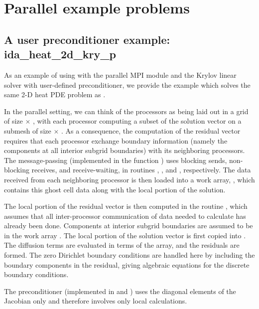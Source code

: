 \section{Parallel example problems}\label{s:ex_parallel}

\subsection{A user preconditioner example: ida\_heat\_2d\_kry\_p}\label{ss:idaHeat2D_p}

As an example of using {\ida} with the parallel MPI {\nvecp} module and the Krylov 
linear solver {\sunlinsolspgmr} with user-defined preconditioner, we provide the example
 which solves the same 2-D heat PDE problem as . 

In the parallel setting, we can think of the processors as being laid out
in a grid of size  $\times$ , with each processor computing
a subset of the solution vector on a submesh of size  $\times$
.  As a consequence, the computation of the residual
vector requires that each processor exchange boundary information
(namely the components at all interior subgrid boundaries) with its
neighboring processors.  The message-passing (implemented in the
function ) uses blocking sends, non-blocking receives, and
receive-waiting, in routines , , and
, respectively.  The data received from each neighboring
processor is then loaded into a work array, , which contains
this ghost cell data along with the local portion of the solution.

The local portion of the residual vector is then computed in the
routine , which assumes that all inter-processor
communication of data needed to calculate  has already been
done.  Components at interior subgrid boundaries are assumed to be in
the work array .  The local portion of the solution vector
 is first copied into .  The diffusion terms are
evaluated in terms of the  array, and the residuals are
formed.  The zero Dirichlet boundary conditions are handled here by
including the boundary components in the residual, giving algebraic
equations for the discrete boundary conditions.

The preconditioner (implemented in  and ) uses the
diagonal elements of the Jacobian only and therefore involves only local calculations.

